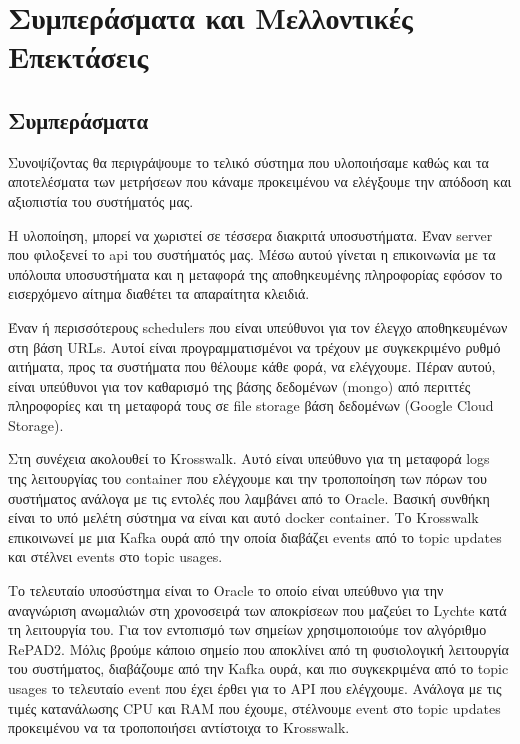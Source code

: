 
\chapter{Συμπεράσματα και Μελλοντικές Επεκτάσεις}
\label{chapter:end}

\section{Συμπεράσματα}
\label{section:conclusion}

Συνοψίζοντας θα περιγράψουμε το τελικό σύστημα που υλοποιήσαμε καθώς και τα αποτελέσματα των μετρήσεων που κάναμε προκειμένου να ελέγξουμε την απόδοση και αξιοπιστία του συστήματός μας.

Η υλοποίηση, μπορεί να χωριστεί σε τέσσερα διακριτά υποσυστήματα. Έναν server που φιλοξενεί το api του συστήματός μας. Μέσω αυτού γίνεται η επικοινωνία με τα υπόλοιπα υποσυστήματα και η μεταφορά της αποθηκευμένης πληροφορίας εφόσον το εισερχόμενο αίτημα διαθέτει τα απαραίτητα κλειδιά.

Έναν ή περισσότερους schedulers που είναι υπεύθυνοι για τον έλεγχο αποθηκευμένων στη βάση URLs. Αυτοί είναι προγραμματισμένοι να τρέχουν με συγκεκριμένο ρυθμό αιτήματα, προς τα συστήματα που θέλουμε κάθε φορά, να ελέγχουμε. Πέραν αυτού, είναι υπεύθυνοι για τον καθαρισμό της βάσης δεδομένων (mongo) από περιττές πληροφορίες και τη μεταφορά τους σε file storage βάση δεδομένων (Google Cloud Storage).

Στη συνέχεια ακολουθεί το Krosswalk. Αυτό είναι υπεύθυνο για τη μεταφορά logs της λειτουργίας του container που ελέγχουμε και την τροποποίηση των πόρων του συστήματος ανάλογα με τις εντολές που λαμβάνει από το Oracle. Βασική συνθήκη είναι το υπό μελέτη σύστημα να είναι και αυτό docker container. Το Krosswalk επικοινωνεί με μια Kafka ουρά από την οποία διαβάζει events από το topic updates και στέλνει events στο topic usages.

Το τελευταίο υποσύστημα είναι το Oracle το οποίο είναι υπεύθυνο για την αναγνώριση ανωμαλιών στη χρονοσειρά των αποκρίσεων που μαζεύει το Lychte κατά τη λειτουργία του. Για τον εντοπισμό των σημείων χρησιμοποιούμε τον αλγόριθμο RePAD2. Μόλις βρούμε κάποιο σημείο που αποκλίνει από τη φυσιολογική λειτουργία του συστήματος, διαβάζουμε από την Kafka ουρά, και πιο συγκεκριμένα από το topic usages το τελευταίο event που έχει έρθει για το API που ελέγχουμε. Ανάλογα με τις τιμές κατανάλωσης CPU και RAM που έχουμε, στέλνουμε event στο topic updates προκειμένου να τα τροποποιήσει αντίστοιχα το Krosswalk.

